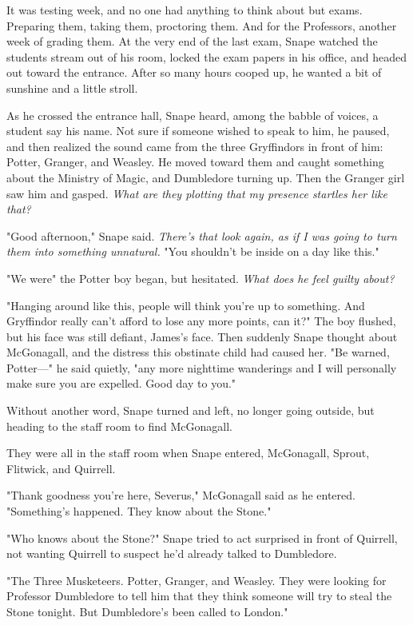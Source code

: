 \sbreak

It was testing week, and no one had anything to think about but exams. Preparing them, taking them, proctoring them. And for the Professors, another week of grading them. At the very end of the last exam, Snape watched the students stream out of his room, locked the exam papers in his office, and headed out toward the entrance. After so many hours cooped up, he wanted a bit of sunshine and a little stroll.

As he crossed the entrance hall, Snape heard, among the babble of voices, a student say his name. Not sure if someone wished to speak to him, he paused, and then realized the sound came from the three Gryffindors in front of him: Potter, Granger, and Weasley. He moved toward them and caught something about the Ministry of Magic, and Dumbledore turning up. Then the Granger girl saw him and gasped. \emph{What are they plotting that my presence startles her like that?}

"Good afternoon," Snape said. \emph{There's that look again, as if I was going to turn them into{\el} something unnatural.} "You shouldn't be inside on a day like this."

"We were{\el}" the Potter boy began, but hesitated. \emph{What does he feel guilty about?}

"Hanging around like this, people will think you're up to something. And Gryffindor really can't afford to lose any more points, can it?" The boy flushed, but his face was still defiant, James's face. Then suddenly Snape thought about McGonagall, and the distress this obstinate child had caused her. "Be warned, Potter—" he said quietly, "any more nighttime wanderings and I will personally make sure you are expelled. Good day to you."

Without another word, Snape turned and left, no longer going outside, but heading to the staff room to find McGonagall.

They were all in the staff room when Snape entered, McGonagall, Sprout, Flitwick, and Quirrell.

"Thank goodness you're here, Severus," McGonagall said as he entered. "Something's happened. They know about the Stone."

"Who knows about the Stone?" Snape tried to act surprised in front of Quirrell, not wanting Quirrell to suspect he'd already talked to Dumbledore.

"The Three Musketeers. Potter, Granger, and Weasley. They were looking for Professor Dumbledore to tell him that they think someone will try to steal the Stone tonight. But Dumbledore's been called to London."


